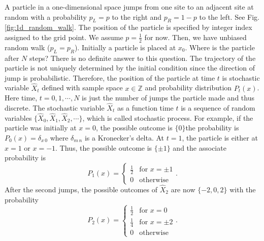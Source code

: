 A particle in a one-dimensional space jumps from one site to an adjacent site at random with a probability $p_L=p$ to the right and $p_R=1-p$ to the left.  See Fig. \ref{fig:1d_random_walk}.  The position of the particle is specified by integer index assigned to the grid point.
We assume $p=\frac{1}{2}$ for now.  Then, we have unbiased random walk ($p_L=p_R$). Initially a particle is placed at $x_0$.  Where is the particle after $N$ steps?  There is no definite answer to this question. The trajectory of the particle is not uniquely determined by the initial condition since the direction of jump is probabilistic.  Therefore, the position of the particle at  time $t$ is stochastic variable $\hat{X}_t$ defined with sample space $x \in \mathbb{Z}$ and probability distribution $P_t(x)$.  Here time, $t=0, 1, \cdots, N$ is just the number of jumps the particle made and thus discrete.   The stochastic variable $\hat{X}_t$ as a function time $t$ is a sequence of random variables
$\{\hat{X}_0, \hat{X}_1, \hat{X}_2, \cdots\}$, which is called stochastic process.
For example, if the particle was initially at $x=0$, the possible outcome is $\{0\}$the probability is $P_0(x)=\delta_{x\,0}$ where $\delta_{m\,n}$ is a Kronecker's delta.  At $t=1$, the particle is either at $x=1$ or $x=-1$.  Thus, the possible outcome is $\{\pm 1\} $ and the associate probability is
\begin{equation}
P_1(x) = 
\begin{cases}
\displaystyle\frac{1}{2} & \text{for  } x=\pm 1 \\[1.5ex]
0 & \text{otherwise}
\end{cases}.
\end{equation}
After the second jumps, the possible outcomes of $\hat{X}_2$ are now $\{-2,0,2\}$ with the probability
\begin{equation}
P_2(x) = 
\begin{cases}
\displaystyle\frac{1}{2} & \text{for  } x=0 \\[1.5ex]
\displaystyle\frac{1}{4} & \text{for  } x=\pm 2 \\[1.5ex]
0 & \text{otherwise}
\end{cases}.
\end{equation}

